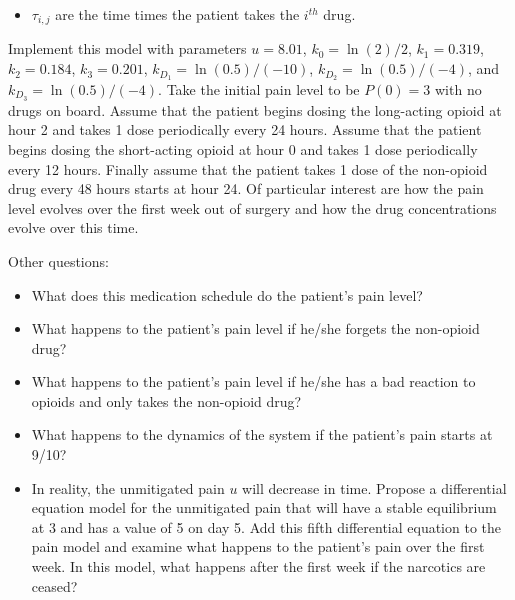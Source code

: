 \begin{problem}
\begin{itemize}
        \item $\tau_{i,j}$ are the time times the patient takes the $i^{th}$ drug.
    \end{itemize}
    Implement this model with parameters
    $u=8.01$, $k_0 = \ln(2)/2$, $k_1 = 0.319$, $k_2 = 0.184$, $k_3 = 0.201$, $k_{D_1} =
    \ln(0.5)/(-10)$, $k_{D_2} = \ln(0.5)/(-4)$, and $k_{D_3} = \ln(0.5)/(-4)$.  Take the
    initial pain level to be $P(0) = 3$ with no drugs on board.  Assume that the patient
    begins dosing the long-acting opioid at hour 2 and takes 1 dose periodically every 24 hours.
    Assume that the patient begins dosing the short-acting opioid at hour 0 and takes 1 dose
    periodically every 12 hours.  Finally assume that the patient takes 1 dose of the non-opioid
    drug every 48 hours starts at hour 24.  Of particular interest are how the pain level
    evolves over the first week out of surgery and how the drug concentrations evolve
    over this time.  
    
    \noindent Other questions:
    \begin{itemize}
        \item What does this medication schedule do the patient's pain level?
        \item What happens to the patient's pain level if he/she forgets the non-opioid
            drug?
        \item What happens to the patient's pain level if he/she has a bad reaction to
            opioids and only takes the non-opioid drug?
        \item What happens to the dynamics of the system if the patient's pain starts at
            9/10?
        \item In reality, the unmitigated pain $u$ will decrease in time.  Propose a
            differential equation model for the unmitigated pain that will have a stable
            equilibrium at 3 and has a value of 5 on day 5. Add this fifth differential
            equation to the pain model and examine what happens to the patient's pain
            over the first week. In this model, what happens after the first week if the
            narcotics are ceased?
    \end{itemize}
\end{problem}


